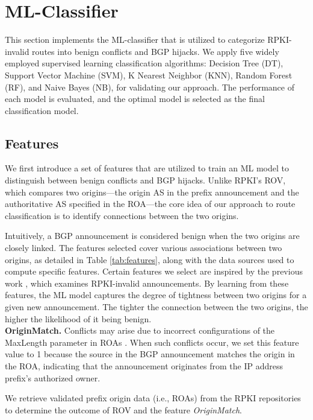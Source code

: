 \vspace{-10pt}
\section{ML-Classifier} \label{sec:lov_classifier}
This section implements the ML-classifier that is utilized to categorize RPKI-invalid routes into benign conflicts and BGP hijacks. We apply five widely employed supervised learning classification algorithms: Decision Tree (DT), Support Vector Machine (SVM), K Nearest Neighbor (KNN), Random Forest (RF), and Naive Bayes (NB), for validating our approach. The performance of each model is evaluated, and the optimal model is selected as the final classification model.
\vspace{-10pt}
\subsection{Features} \label{sec:lov_features}
We first introduce a set of features that are utilized to train an ML model to distinguish between benign conflicts and BGP hijacks.
Unlike RPKI's ROV, which compares two origins—the origin AS in the prefix announcement and the authoritative AS specified in the ROA—the core idea of our approach to route classification is to identify connections between the two origins.

Intuitively, a BGP announcement is considered benign when the two origins are closely linked.
The features selected cover various associations between two origins, as detailed in Table \ref{tab:features}, along with the data sources used to compute specific features.
Certain features we select are inspired by the previous work \cite{chung2019rpki}, which examines RPKI-invalid announcements. By learning from these features, the ML model captures the degree of tightness between two origins for a given new announcement. The tighter the connection between the two origins, the higher the likelihood of it being benign.\\

\noindent\textbf{OriginMatch.} Conflicts may arise due to incorrect configurations of the MaxLength parameter in ROAs \cite{gilad2017maxlength}. When such conflicts occur, we set this feature value to 1 because the source in the BGP announcement matches the origin in the ROA, indicating that the announcement originates from the IP address prefix's authorized owner.

We retrieve validated prefix origin data (i.e., ROAs) from the RPKI repositories to determine the outcome of ROV and the feature \textit{OriginMatch}.

